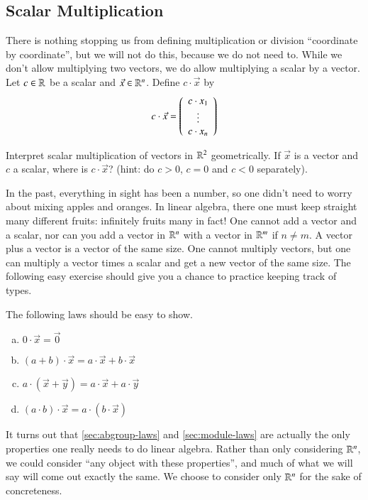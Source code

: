 \subsection{Scalar Multiplication}
There is nothing stopping us from defining multiplication or division ``coordinate by coordinate'', but we will not do this, because we do not need to.  
While we don't allow multiplying two vectors, we do allow multiplying a scalar by a vector.  
Let $c\in \mathbb{R}$ be a scalar and $\vec{x}\in\mathbb{R}^n$.  
Define $c\cdot \vec{x}$ by
\[c\cdot\vec{x}=\left(\begin{array}{c}c\cdot x_1 \\ \vdots \\ c\cdot x_n\end{array}\right)\]
\begin{ImpEasyEx}
  Interpret scalar multiplication of vectors in $\mathbb{R}^2$ geometrically.  
  If $\vec{x}$ is a vector and $c$ a scalar, where is $c\cdot\vec{x}$?
  (hint: do $c>0$, $c=0$ and $c<0$ separately).  
\end{ImpEasyEx}
\begin{ImportantRemark}
  In the past, everything in sight has been a number, so one didn't need to worry about mixing apples and oranges.
  In linear algebra, there one must keep straight many different fruits: infinitely fruits many in fact!
  One cannot add a vector and a scalar, nor can you add a vector in $\mathbb{R}^n$ with a vector in $\mathbb{R}^m$ if $n\ne m$.  
  A vector plus a vector is a vector of the same size.  
  One cannot multiply vectors, but one can multiply a vector times a scalar and get a new vector of the same size.
  The following easy exercise should give you a chance to practice keeping track of types.  
\end{ImportantRemark}
\begin{ImpEasyEx}
  \label{sec:module-laws}
  The following laws should be easy to show.
  \begin{enumerate}[a)]
  \item $0\cdot\vec{x} = \vec{0}$
  \item $(a+b)\cdot\vec{x} = a\cdot\vec{x} + b\cdot\vec{x}$
  \item $a\cdot (\vec{x} + \vec{y}) = a\cdot\vec{x} + a\cdot\vec{y}$
  \item $(a\cdot b)\cdot\vec{x} = a\cdot (b\cdot\vec{x})$
  \end{enumerate}
\end{ImpEasyEx}

\begin{RemarkExp}
  It turns out that \ref{sec:abgroup-laws} and \ref{sec:module-laws} are actually the only properties one really needs to do linear algebra.
  Rather than only considering $\mathbb{R}^n$, we could consider ``any object with these properties'', and much of what we will say will come out exactly the same.
  We choose to consider only $\mathbb{R}^n$ for the sake of concreteness.  
\end{RemarkExp}



